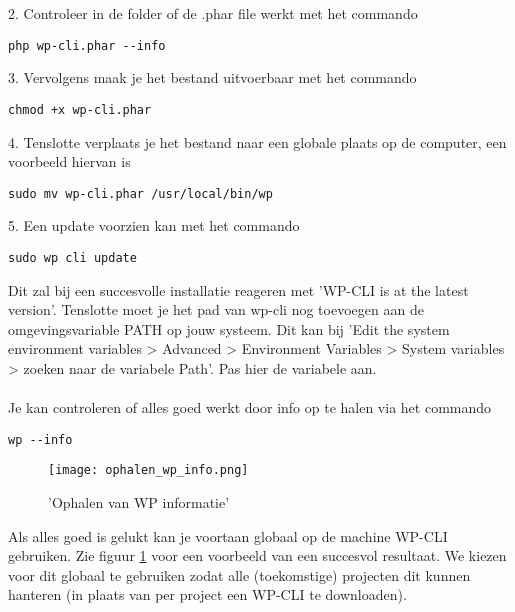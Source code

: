 2. Controleer in de folder of de .phar file werkt met het commando
\begin{verbatim}
php wp-cli.phar --info
\end{verbatim}
3. Vervolgens maak je het bestand uitvoerbaar met het commando
\begin{verbatim}
chmod +x wp-cli.phar
\end{verbatim}
4. Tenslotte verplaats je het bestand naar een globale plaats op de computer, een voorbeeld hiervan is
\begin{verbatim}
sudo mv wp-cli.phar /usr/local/bin/wp
\end{verbatim}
5. Een update voorzien kan met het commando
\begin{verbatim}
sudo wp cli update
\end{verbatim}
Dit zal bij een succesvolle installatie reageren met 'WP-CLI is at the latest version'. Tenslotte moet je het pad van wp-cli nog toevoegen aan de omgevingsvariable PATH op jouw systeem. Dit kan bij 'Edit the system environment variables > Advanced > Environment Variables > System variables > zoeken naar de variabele Path'. Pas hier de variabele aan.
\\\\
Je kan controleren of alles goed werkt door info op te halen via het commando
\begin{verbatim}
wp --info
\end{verbatim}
\begin{figure}
    \caption{'Ophalen van WP informatie'}
    \label{ophalen_wp_info}
    \centering
    \texttt{[image: ophalen\_wp\_info.png]}
\end{figure}Als alles goed is gelukt kan je voortaan globaal op de machine WP-CLI gebruiken. Zie figuur \ref{ophalen_wp_info} voor een voorbeeld van een succesvol resultaat. We kiezen voor dit globaal te gebruiken zodat alle (toekomstige) projecten dit kunnen hanteren (in plaats van per project een WP-CLI te downloaden). 
